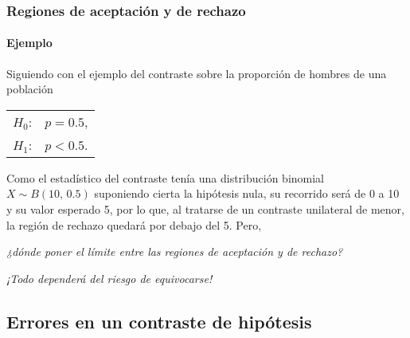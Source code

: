 \begin{frame}
\frametitle{Regiones de aceptación y de rechazo}
\framesubtitle{Ejemplo}
Siguiendo con el ejemplo del contraste sobre la proporción de hombres de una población
\begin{center}
\begin{tabular}{ll}
$H_0$: & $p=0.5$,\\
$H_1$: & $p<0.5$.
\end{tabular}
\end{center}
Como el estadístico del contraste tenía una distribución binomial $X\sim B(10,\,0.5)$ suponiendo cierta la hipótesis
nula, su recorrido será de 0 a 10 y su valor esperado 5, por lo que, al tratarse de un contraste unilateral de menor, la
región de rechazo quedará por debajo del 5. Pero,
\begin{center}
\emph{¿dónde poner el límite entre las regiones de aceptación y de rechazo?}

\begin{center}
\end{center}

\alert{\emph{¡Todo dependerá del riesgo de equivocarse!}}
\end{center}
\end{frame}


\subsection{Errores en un contraste de hipótesis}


